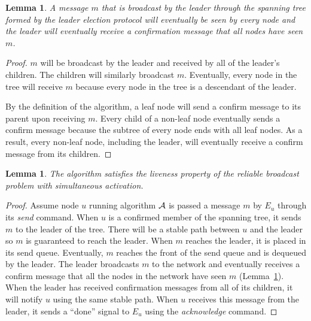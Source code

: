\documentclass[english]{article}
\newtheorem{lemma}[theorem]{Lemma}
\begin{document}
\begin{lemma}
\label{StaticSpanningTree}
A message $m$ that is broadcast by the leader through the spanning tree formed by the leader election protocol will eventually be seen by every node and the leader will eventually receive a confirmation message that all nodes have seen $m$.
\end{lemma}
\begin{proof}

$m$ will be broadcast by the leader and received by all of the leader's children. The children will similarly broadcast $m$. Eventually, every node in the tree will receive $m$ because every node in the tree is a descendant of the leader. 

By the definition of the algorithm, a leaf node will send a confirm message to its parent upon receiving $m$. Every child of a non-leaf node eventually sends a confirm message because the subtree of every node ends with all leaf nodes. As a result, every non-leaf node, including the leader, will eventually receive a confirm message from its children.

\end{proof}


\begin{lemma}
\label{StaticRBLiveness}
The algorithm satisfies the liveness property of the reliable broadcast problem with simultaneous activation.
\end{lemma}
\begin{proof}

Assume node $u$ running algorithm $\cal A$ is passed a message $m$ by $E_u$ through its \textit{send} command. When $u$ is a confirmed member of the spanning tree, it sends $m$ to the leader of the tree. There will be a stable path between $u$ and the leader so $m$ is guaranteed to reach the leader. When $m$ reaches the leader, it is placed in its send queue. Eventually, $m$ reaches the front of the send queue and is dequeued by the leader. The leader broadcasts $m$ to the network and eventually receives a confirm message that all the nodes in the network have seen $m$ (Lemma~\ref{StaticSpanningTree}). When the leader has received confirmation messages from all of its children, it will notify $u$ using the same stable path. When $u$ receives this message from the leader, it sends  a ``done'' signal to $E_u$ using the \textit{acknowledge} command.

\end{proof}
\end{document}
